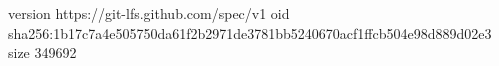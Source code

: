 version https://git-lfs.github.com/spec/v1
oid sha256:1b17c7a4e505750da61f2b2971de3781bb5240670acf1ffcb504e98d889d02e3
size 349692
